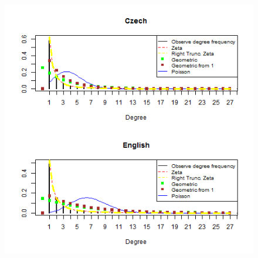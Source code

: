 \documentclass[paper=a4, fontsize=11pt]{scrartcl} %
\theoremstyle{plain}
\begin{document}
\begin{figure}[htbp] %
   \centering
   \includegraphics[width=15cm,height=27cm]{General_3} %
\end{figure}
\end{document}
